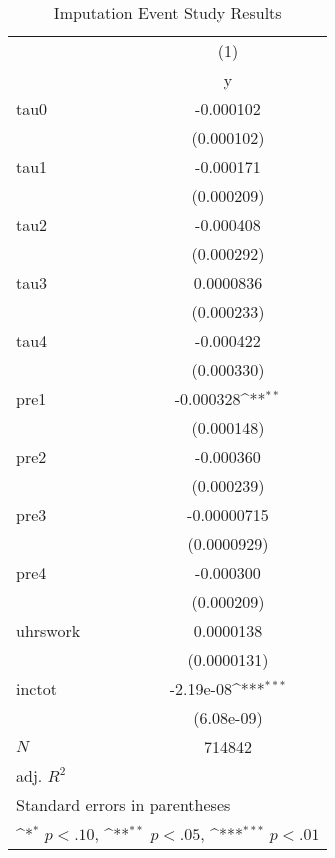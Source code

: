 \begin{table}[htbp]\centering
\def\sym#1{\ifmmode^{#1}\else\(^{#1}\)\fi}
\caption{Imputation Event Study Results}
\begin{tabular}{l*{1}{c}}
\hline\hline
            &\multicolumn{1}{c}{(1)}\\
            &\multicolumn{1}{c}{y}\\
\hline
tau0        &   -0.000102         \\
            &  (0.000102)         \\
[1em]
tau1        &   -0.000171         \\
            &  (0.000209)         \\
[1em]
tau2        &   -0.000408         \\
            &  (0.000292)         \\
[1em]
tau3        &   0.0000836         \\
            &  (0.000233)         \\
[1em]
tau4        &   -0.000422         \\
            &  (0.000330)         \\
[1em]
pre1        &   -0.000328\sym{**} \\
            &  (0.000148)         \\
[1em]
pre2        &   -0.000360         \\
            &  (0.000239)         \\
[1em]
pre3        & -0.00000715         \\
            & (0.0000929)         \\
[1em]
pre4        &   -0.000300         \\
            &  (0.000209)         \\
[1em]
uhrswork    &   0.0000138         \\
            & (0.0000131)         \\
[1em]
inctot      &   -2.19e-08\sym{***}\\
            &  (6.08e-09)         \\
\hline
\(N\)       &      714842         \\
adj. \(R^{2}\)&                     \\
\hline\hline
\multicolumn{2}{l}{\footnotesize Standard errors in parentheses}\\
\multicolumn{2}{l}{\footnotesize \sym{*} \(p<.10\), \sym{**} \(p<.05\), \sym{***} \(p<.01\)}\\
\end{tabular}
\end{table}
